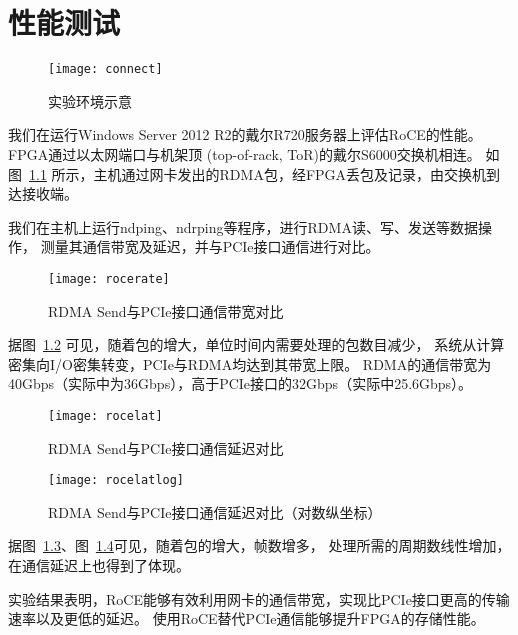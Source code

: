 \chapter{性能测试}
\begin{figure}[htbp]
\centering
\texttt{[image: connect]}
\caption{实验环境示意}\label{fig:connect}
\end{figure}
我们在运行Windows Server 2012 R2的戴尔R720服务器上评估RoCE的性能。
FPGA通过以太网端口与机架顶 (top-of-rack, ToR)的戴尔S6000交换机\cite{s6000}相连。
如图~\ref{fig:connect} 所示，主机通过网卡发出的RDMA包，经FPGA丢包及记录，由交换机到达接收端。

我们在主机上运行ndping、ndrping等程序，进行RDMA读、写、发送等数据操作，
测量其通信带宽及延迟，并与PCIe接口通信进行对比。

\begin{figure}[htbp]
\centering
\texttt{[image: rocerate]}
\caption{RDMA Send与PCIe接口通信带宽对比}\label{fig:rocerate}
\end{figure}

据图~\ref{fig:rocerate} 可见，随着包的增大，单位时间内需要处理的包数目减少，
系统从计算密集向I/O密集转变，PCIe与RDMA均达到其带宽上限。
RDMA的通信带宽为40Gbps（实际中为36Gbps），高于PCIe接口的32Gbps（实际中25.6Gbps）。

\begin{figure}[htbp]
\centering
\texttt{[image: rocelat]}
\caption{RDMA Send与PCIe接口通信延迟对比}\label{fig:rocelat}
\end{figure}

\begin{figure}[htbp]
\centering
\texttt{[image: rocelatlog]}
\caption{RDMA Send与PCIe接口通信延迟对比（对数纵坐标）}\label{fig:rocelatlog}
\end{figure}

据图~\ref{fig:rocelat}、图~\ref{fig:rocelatlog}可见，随着包的增大，帧数增多，
处理所需的周期数线性增加，在通信延迟上也得到了体现。

实验结果表明，RoCE能够有效利用网卡的通信带宽，实现比PCIe接口更高的传输速率以及更低的延迟。
使用RoCE替代PCIe通信能够提升FPGA的存储性能。
